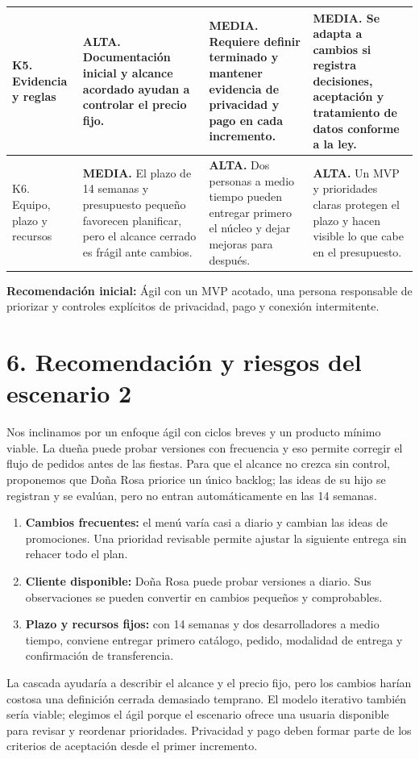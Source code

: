 \documentclass[10pt,letterpaper]{article}
\newcommand{\titulo}[1]{\section*{\textcolor{verde}{#1}}}
\begin{document}
\begin{longtable}{@{}p{3.15cm}p{7.15cm}p{7.15cm}p{7.15cm}@{}}
K5. Evidencia y reglas&\textbf{ALTA.} Documentación inicial y alcance acordado ayudan a controlar el precio fijo.&\textbf{MEDIA.} Requiere definir terminado y mantener evidencia de privacidad y pago en cada incremento.&\textbf{MEDIA.} Se adapta a cambios si registra decisiones, aceptación y tratamiento de datos conforme a la ley.\\\hline
K6. Equipo, plazo y recursos&\textbf{MEDIA.} El plazo de 14 semanas y presupuesto pequeño favorecen planificar, pero el alcance cerrado es frágil ante cambios.&\textbf{ALTA.} Dos personas a medio tiempo pueden entregar primero el núcleo y dejar mejoras para después.&\textbf{ALTA.} Un MVP y prioridades claras protegen el plazo y hacen visible lo que cabe en el presupuesto.\\
\end{longtable}
\par
\normalsize
\par
\textbf{Recomendación inicial:} Ágil con un MVP acotado, una persona responsable de priorizar y controles explícitos de privacidad, pago y conexión intermitente.
\par
\titulo{6. Recomendación y riesgos del escenario 2}
\par
Nos inclinamos por un enfoque ágil con ciclos breves y un producto mínimo viable. La dueña puede probar versiones con frecuencia y eso permite corregir el flujo de pedidos antes de las fiestas. Para que el alcance no crezca sin control, proponemos que Doña Rosa priorice un único backlog; las ideas de su hijo se registran y se evalúan, pero no entran automáticamente en las 14 semanas.
\par
\begin{enumerate}[leftmargin=*,itemsep=1pt]
\item \textbf{Cambios frecuentes:} el menú varía casi a diario y cambian las ideas de promociones. Una prioridad revisable permite ajustar la siguiente entrega sin rehacer todo el plan.
\item \textbf{Cliente disponible:} Doña Rosa puede probar versiones a diario. Sus observaciones se pueden convertir en cambios pequeños y comprobables.
\item \textbf{Plazo y recursos fijos:} con 14 semanas y dos desarrolladores a medio tiempo, conviene entregar primero catálogo, pedido, modalidad de entrega y confirmación de transferencia.
\end{enumerate}
\par
La cascada ayudaría a describir el alcance y el precio fijo, pero los cambios harían costosa una definición cerrada demasiado temprano. El modelo iterativo también sería viable; elegimos el ágil porque el escenario ofrece una usuaria disponible para revisar y reordenar prioridades. Privacidad y pago deben formar parte de los criterios de aceptación desde el primer incremento.
\end{document}
